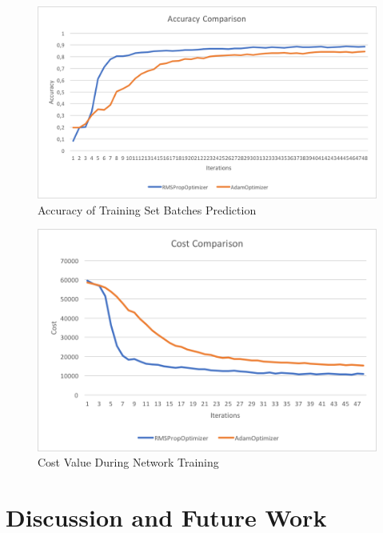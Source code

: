 \documentclass[final,12p,times]{elsarticle}
\begin{document}
\begin{figure}[H]
  \includegraphics[width=1.0\textwidth, center]{accuracy_comp.png}
  \caption{Accuracy of Training Set Batches Prediction}
  \label{fig:Fig5.2}
  \end{figure}
  
  \begin{figure}[H]
  \includegraphics[width=1.0\textwidth, center]{cost_comp.png}
  \caption{Cost Value During Network Training}
  \label{fig:Fig5.3}
  \end{figure}







\section{Discussion and Future Work}
\label{sec:6}
\end{document}
